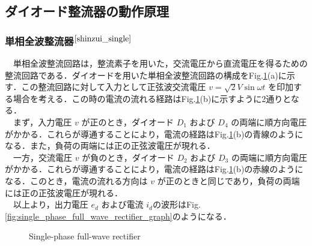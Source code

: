 \subsection{ダイオード整流器の動作原理}
\subsubsection{単相全波整流器$^{\cite{shinzui_single}}$}
　単相全波整流回路は，整流素子を用いた，交流電圧から直流電圧を得るための整流回路である．ダイオードを用いた単相全波整流回路の構成をFig.\ref{fig:single_phase_full_wave_rectifier_circuit}(a)に示す．この整流回路に対して入力として正弦波交流電圧 $v = \sqrt{2} V \sin \omega t$ を印加する場合を考える．この時の電流の流れる経路はFig.\ref{fig:single_phase_full_wave_rectifier_circuit}(b)に示すように2通りとなる．\\
　まず，入力電圧 $v$ が正のとき，ダイオード $D_1$ および $D_4$ の両端に順方向電圧がかかる．これらが導通することにより，電流の経路はFig.\ref{fig:single_phase_full_wave_rectifier_circuit}(b)の青線のようになる．また，負荷の両端には正の正弦波電圧が現れる．\\
　一方，交流電圧 $v$ が負のとき，ダイオード $D_2$ および $D_3$ の両端に順方向電圧がかかる．これらが導通することにより，電流の経路はFig.\ref{fig:single_phase_full_wave_rectifier_circuit}(b)の赤線のようになる．このとき，電流の流れる方向は $v$ が正のときと同じであり，負荷の両端には正の正弦波電圧が現れる．\\
　以上より，出力電圧 $e_d$ および電流 $i_d$の波形はFig.\ref{fig:single_phase_full_wave_rectifier_graph}のようになる．
\begin{figure}[H]
    \begin{center}
    \end{center}
    \caption{Single-phase full-wave rectifier}
    \label{fig:single_phase_full_wave_rectifier_circuit}
\end{figure}

